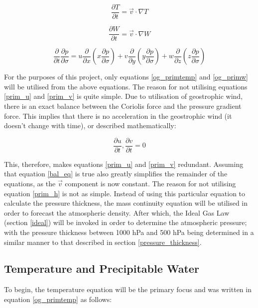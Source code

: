\begin{equation}
    \frac{\partial T}{\partial t} = \Vec{v} \cdot \nabla T
    \label{og_primtemp}
\end{equation}

\begin{equation}
    \frac{\partial W}{\partial t} = \Vec{v} \cdot \nabla W
    \label{og_primw}
\end{equation}

\begin{equation}
    \frac{\partial}{\partial t} \frac{\partial p}{\partial \sigma} = u \frac{\partial}{\partial x} \left( x \frac{\partial p}{\partial \sigma} \right) + v \frac{\partial}{\partial y} \left( y \frac{\partial p}{\partial \sigma} \right) + w \frac{\partial}{\partial z} \left( z \frac{\partial p}{\partial \sigma} \right)
    \label{prim_h}
\end{equation}

For the purposes of this project, only equations \ref{og_primtemp} and \ref{og_primw} will be utilised from the above equations. The reason for not utilising equations \ref{prim_u} and \ref{prim_v} is quite simple. Due to utilisation of geostrophic wind, there is an exact balance between the Coriolis force and the pressure gradient force. This implies that there is no acceleration in the geostrophic wind (it doesn't change with time), or described mathematically:

\begin{equation}
    \frac{\partial u}{\partial t}, \frac{\partial v}{\partial t} = 0
    \label{bal_eq}
\end{equation}

This, therefore, makes equations \ref{prim_u} and \ref{prim_v} redundant. Assuming that equation \ref{bal_eq} is true also greatly simplifies the remainder of the equations, as the $\Vec{v}$ component is now constant. The reason for not utilising equation \ref{prim_h} is not as simple. Instead of using this particular equation to calculate the pressure thickness, the mass continuity equation will be utilised in order to forecast the atmospheric density. After which, the Ideal Gas Law (section \ref{ideal}) will be invoked in order to determine the atmospheric pressure; with the pressure thickness between 1000 hPa and 500 hPa being determined in a similar manner to that described in section \ref{pressure_thickness}.  

\subsection{Temperature and Precipitable Water}
To begin, the temperature equation will be the primary focus and was written in equation \ref{og_primtemp} as follows:

